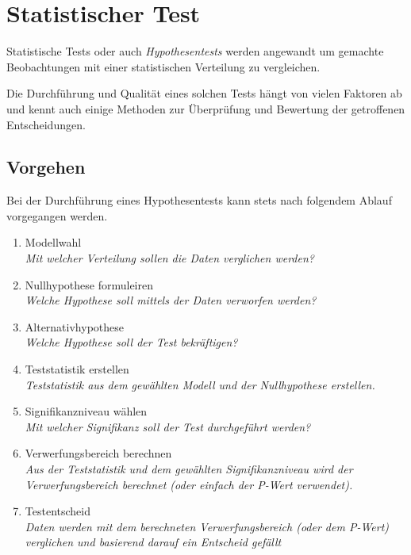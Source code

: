 



\chapter{Statistischer Test}
Statistische Tests oder auch \emph{Hypothesentests} werden angewandt um
gemachte Beobachtungen mit einer statistischen Verteilung zu vergleichen.

Die Durchführung und Qualität eines solchen Tests hängt von vielen Faktoren
ab und kennt auch einige Methoden zur Überprüfung und Bewertung der
getroffenen Entscheidungen.

\newpage
\section{Vorgehen}
Bei der Durchführung eines Hypothesentests kann stets nach folgendem Ablauf 
vorgegangen werden.

\begin{enumerate}
	\item Modellwahl \\ 
		\textit{Mit welcher Verteilung sollen die Daten verglichen 
			werden?}
	\item Nullhypothese formuleiren \\
		\textit{Welche Hypothese soll mittels der Daten verworfen 
			werden?}
	\item Alternativhypothese \\
		\textit{Welche Hypothese soll der Test bekräftigen?}
	\item Teststatistik erstellen \\
		\textit{Teststatistik aus dem gewählten Modell und der 
			Nullhypothese erstellen.}
	\item Signifikanzniveau wählen \\
		\textit{Mit welcher Signifikanz soll der Test durchgeführt 
			werden?}
	\item Verwerfungsbereich berechnen \\
		\textit{Aus der Teststatistik und dem gewählten 
			Signifikanzniveau wird der Verwerfungsbereich 
			berechnet (oder einfach der P-Wert verwendet).}
	\item Testentscheid \\
		\textit{Daten werden mit dem berechneten Verwerfungsbereich 
			(oder dem P-Wert) verglichen und basierend darauf ein 
			Entscheid gefällt}
\end{enumerate}

